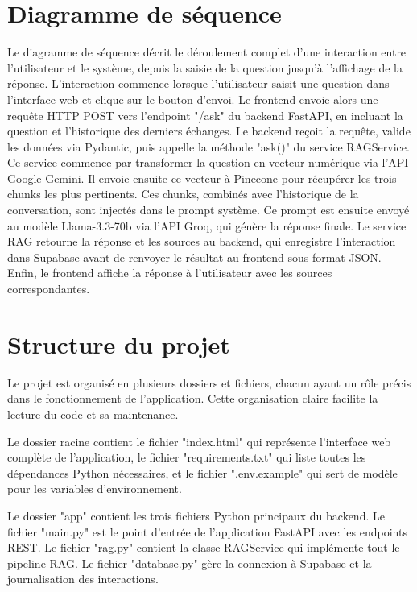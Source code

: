 \documentclass[12pt, a4paper, twoside]{report}
\begin{document}
\section{Diagramme de séquence}
Le diagramme de séquence décrit le déroulement complet d'une interaction entre l'utilisateur et le système, depuis la saisie de la question jusqu'à l'affichage de la réponse.
\newpage
L'interaction commence lorsque l'utilisateur saisit une question dans l'interface web et clique sur le bouton d'envoi. Le frontend envoie alors une requête HTTP POST vers l'endpoint "/ask" du backend FastAPI, en incluant la question et l'historique des derniers échanges. Le backend reçoit la requête, valide les données via Pydantic, puis appelle la méthode "ask()" du service RAGService. Ce service commence par transformer la question en vecteur numérique via l'API Google Gemini. Il envoie ensuite ce vecteur à Pinecone pour récupérer les trois chunks les plus pertinents. Ces chunks, combinés avec l'historique de la conversation, sont injectés dans le prompt système. Ce prompt est ensuite envoyé au modèle Llama-3.3-70b via l'API Groq, qui génère la réponse finale. Le service RAG retourne la réponse et les sources au backend, qui enregistre l'interaction dans Supabase avant de renvoyer le résultat au frontend sous format JSON. Enfin, le frontend affiche la réponse à l'utilisateur avec les sources correspondantes.



\section{Structure du projet}
Le projet est organisé en plusieurs dossiers et fichiers, chacun ayant un rôle précis dans le fonctionnement de l'application. Cette organisation claire facilite la lecture du code et sa maintenance.

Le dossier racine contient le fichier "index.html" qui représente l'interface web complète de l'application, le fichier "requirements.txt" qui liste toutes les dépendances Python nécessaires, et le fichier ".env.example" qui sert de modèle pour les variables d'environnement.

Le dossier "app" contient les trois fichiers Python principaux du backend. Le fichier "main.py" est le point d'entrée de l'application FastAPI avec les endpoints REST. Le fichier "rag.py" contient la classe RAGService qui implémente tout le pipeline RAG. Le fichier "database.py" gère la connexion à Supabase et la journalisation des interactions.
\end{document}
